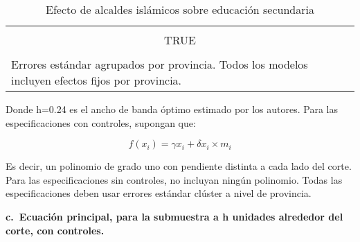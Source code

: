 \documentclass[
]{article}
\begin{document}
\begin{table}[ht!] \centering 
  \caption{Efecto de alcaldes islámicos sobre educación secundaria} 
  \label{tab:rd_controles_mujeres_hombres} 
\begin{tabular}{@{\extracolsep{5pt}} c} 
\\[-1.8ex]\hline 
\hline \\[-1.8ex] 
TRUE \\ 
\hline \\[-1.8ex] 
\multicolumn{1}{l}{Errores estándar agrupados por provincia. Todos los modelos incluyen efectos fijos por provincia.} \\ 
\end{tabular} 
\end{table}

\newpage

Donde h=0.24 es el ancho de banda óptimo estimado por los autores. Para
las especificaciones con controles, supongan que:

\[f(x_i )= γx _i+δx_i×m_i\]

Es decir, un polinomio de grado uno con pendiente distinta a cada lado
del corte. Para las especificaciones sin controles, no incluyan ningún
polinomio. Todas las especificaciones deben usar errores estándar
clúster a nivel de provincia.

\textbf{c.~Ecuación principal, para la submuestra a h unidades alrededor
del corte, con controles.}
\end{document}
